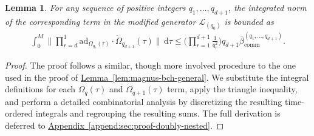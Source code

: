 \documentclass[11pt]{article}
\newtheorem{lemma}{Lemma}
\newcommand{\lem}[1]{\hyperref[lem:#1]{Lemma~\ref*{lem:#1}}}
\newcommand{\append}[1]{\hyperref[append:#1]{Appendix~\ref*{append:#1}}}
\renewcommand{\d}{\mathrm{d}}
\newcommand{\ad}{\mathrm{ad}}
\renewcommand{\comm}{\mathrm{comm}}
\newcommand{\mc}{\mathcal}
\begin{document}
\begin{lemma}
\label{lem:doubly-nested-bound-general}
For any sequence of positive integers $q_1, \ldots, q_{d+1}$, the integrated norm of the corresponding term in the modified generator $\mc L_{(q_0)}$ is bounded as
 \begin{align*}
  \int_{0}^{M} \bigg\|\prod_{r=d}^{1} \ad_{\Omega_{q_{r}}(\tau)}\cdot\dot\Omega_{q_{d+1}}(\tau)\bigg\| \,\d\tau \le \bigg(\prod_{r=1}^{d+1} \frac{1}{q_r^2}\bigg) q_{d+1}\bar{\beta}_{\comm}^{(q_1, \ldots, q_{d+1})}.
 \end{align*}
\end{lemma}
\begin{proof}
The proof follows a similar, though more involved procedure to the one used in the proof of \lem{magnus-bch-general}. We substitute the integral definitions for each $\Omega_q(\tau)$ and $\dot\Omega_{q+1}(\tau)$ term, apply the triangle inequality, and perform a detailed combinatorial analysis by discretizing the resulting time-ordered integrals and regrouping the resulting sums. The full derivation is deferred to \append{sec:proof-doubly-nested}.
\end{proof}
\end{document}

